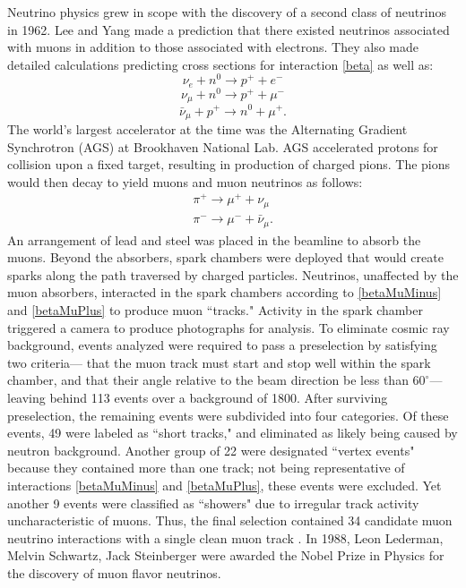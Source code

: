 Neutrino physics grew in scope  with the discovery of a second class of neutrinos in 1962.  Lee and Yang made a prediction that there existed neutrinos associated with muons in addition to those associated with electrons.  They also made detailed calculations predicting cross sections for interaction \eqref{beta} as well as:
\begin{equation} \label{betaMinus} \nu_e + n^0 \rightarrow p^+ + e^- \end{equation}
\begin{equation} \label{betaMuMinus}\nu_\mu + n^0 \rightarrow  p^+ + \mu^- \end{equation}
\begin{equation} \label{betaMuPlus}\bar{\nu}_\mu + p^+ \rightarrow n^0 + \mu^+ . \end{equation}
The world's largest accelerator at the time was the Alternating Gradient Synchrotron (AGS) at Brookhaven National Lab.  AGS accelerated protons for collision upon a fixed target, resulting in production of charged pions.  The pions would then decay to yield muons and muon neutrinos as follows:  
\begin{equation} \label{pions} \begin{split}
\pi^+ \rightarrow \mu^+ + \nu_\mu {\ } \\
\pi^- \rightarrow \mu^- + \bar{\nu}_\mu.
\end{split} \end{equation}
An arrangement of lead and steel was placed in the beamline to absorb the muons.  Beyond the absorbers, spark chambers were deployed that would create sparks along the path traversed by charged particles.  Neutrinos, unaffected by the muon absorbers, interacted in the spark chambers according to \eqref{betaMuMinus} and \eqref{betaMuPlus} to produce muon ``tracks."  Activity in the spark chamber triggered a camera to produce photographs for analysis.  To eliminate cosmic ray background, events analyzed were required to pass a preselection by satisfying two criteria--- that the muon track must start and stop well within the spark chamber, and that their angle relative to the beam direction be less than $60^\circ$--- leaving behind 113 events over a background of 1800.  After surviving preselection, the remaining events were subdivided into four categories.  Of these events, 49 were labeled as ``short tracks," and eliminated as likely being caused by neutron background.  Another group of 22 were designated ``vertex events"  because they contained more than one track; not being representative of interactions \eqref{betaMuMinus} and \eqref{betaMuPlus}, these events were excluded.  Yet another 9 events were classified as ``showers" due to irregular track activity uncharacteristic of muons.  Thus, the final selection contained 34 candidate muon neutrino interactions with a single clean muon track \cite{numuDiscovery}.  In 1988, Leon Lederman, Melvin Schwartz, Jack Steinberger were awarded the Nobel Prize in Physics for the discovery of muon flavor neutrinos.

